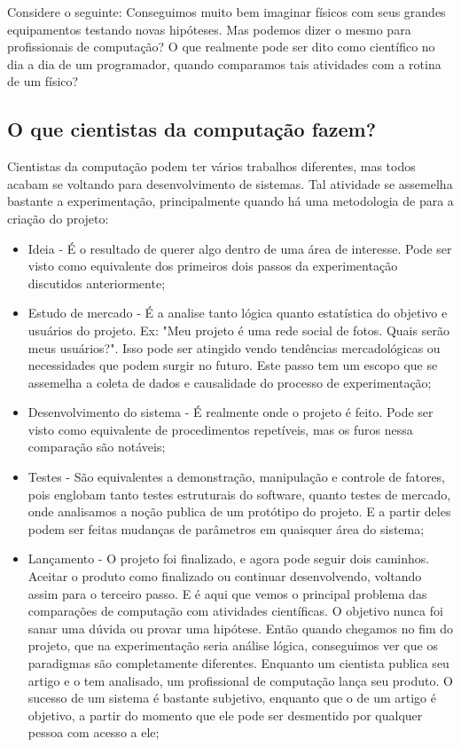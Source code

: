     Considere o seguinte: Conseguimos muito bem imaginar físicos com seus grandes equipamentos testando novas hipóteses. Mas podemos dizer o mesmo para profissionais de computação? O que realmente pode ser dito como científico no dia a dia de um programador, quando comparamos tais atividades com a rotina de um físico?

\subsection{O que cientistas da computação fazem?}
    Cientistas da computação podem ter vários trabalhos diferentes, mas todos acabam se voltando para desenvolvimento de sistemas. Tal atividade se assemelha bastante a experimentação, principalmente quando há uma metodologia de para a criação do projeto:
    \begin{itemize}
        \item Ideia - É o resultado de querer algo dentro de uma área de interesse. Pode ser visto como equivalente dos primeiros dois passos da experimentação discutidos anteriormente;
        \item Estudo de mercado - É a analise tanto lógica quanto estatística do objetivo e usuários do projeto. Ex: "Meu projeto é uma rede social de fotos. Quais serão meus usuários?". Isso pode ser atingido vendo tendências mercadológicas ou necessidades que podem surgir no futuro. Este passo tem um escopo que se assemelha a coleta de dados e causalidade do processo de experimentação;
        \item Desenvolvimento do sistema - É realmente onde o projeto é feito. Pode ser visto como equivalente de procedimentos repetíveis, mas os furos nessa comparação são notáveis;
        \item Testes - São equivalentes a demonstração, manipulação e controle de fatores, pois englobam tanto testes estruturais do software, quanto testes de mercado, onde analisamos a noção publica de um protótipo do projeto. E a partir deles podem ser feitas mudanças de parâmetros em quaisquer área do sistema;
        \item Lançamento - O projeto foi finalizado, e agora pode seguir dois caminhos. Aceitar o produto como finalizado ou continuar desenvolvendo, voltando assim para o terceiro passo. E é aqui que vemos o principal problema das comparações de computação com atividades científicas. O objetivo nunca foi sanar uma dúvida ou provar uma hipótese. Então quando chegamos no fim do projeto, que na experimentação seria análise lógica, conseguimos ver que os paradigmas são completamente diferentes. Enquanto um cientista publica seu artigo e o tem analisado, um profissional de computação lança seu produto. O sucesso de um sistema é bastante subjetivo, enquanto que o de um artigo é objetivo, a partir do momento que ele pode ser desmentido por qualquer pessoa com acesso a ele;
    \end{itemize}

